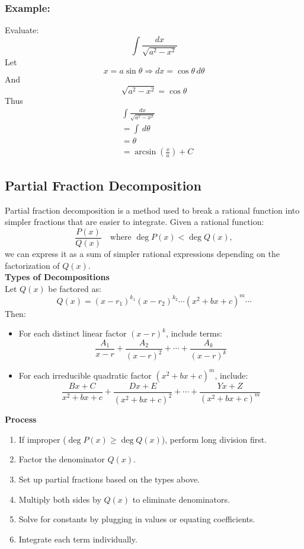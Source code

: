 \documentclass[11pt]{article}
\begin{document}
\subsubsection*{Example:}
Evaluate:
\[
    \int \frac{dx}{\sqrt{a^2-x^2}}
\]
Let
\[
    x=a\sin\theta \Rightarrow dx=\cos\theta\,d\theta
\]
And
\[
    \sqrt{a^2-x^2}=\cos\theta
\]
Thus
\[
    \begin{aligned}
        &\int \frac{dx}{\sqrt{a^2-x^2}}\\[.5em]
        &=\int\,d\theta\\[.5em]
        &=\theta\\[.5em]
        &=\arcsin(\frac{x}{a})+C
    \end{aligned}
\]
\subsection{Partial Fraction Decomposition}
Partial fraction decomposition is a method used to break a rational function into simpler fractions that are easier to integrate.
Given a rational function:
\[
    \frac{P(x)}{Q(x)} \quad \text{where } \deg P(x) < \deg Q(x),
\]
we can express it as a sum of simpler rational expressions depending on the factorization of $Q(x)$.\\[.5em]
\textbf{Types of Decompositions}\\[.5em]
\noindent
Let $Q(x)$ be factored as:
\[
    Q(x) = (x - r_1)^{k_1}(x - r_2)^{k_2}\cdots (x^2 + bx + c)^m\cdots
\]Then:
\begin{itemize}
    \item For each distinct linear factor $(x - r)^k$, include terms:
    \[
    \frac{A_1}{x - r} + \frac{A_2}{(x - r)^2} + \cdots + \frac{A_k}{(x - r)^k}
    \]
    
    \item For each irreducible quadratic factor $(x^2 + bx + c)^m$, include:
    \[
    \frac{Bx + C}{x^2 + bx + c} + \frac{Dx + E}{(x^2 + bx + c)^2} + \cdots + \frac{Yx + Z}{(x^2 + bx + c)^m}
    \]
\end{itemize}
\noindent
\textbf{Process}
\begin{enumerate}
    \item If improper ($\deg P(x) \geq \deg Q(x)$), perform long division first.
    \item Factor the denominator $Q(x)$.
    \item Set up partial fractions based on the types above.
    \item Multiply both sides by $Q(x)$ to eliminate denominators.
    \item Solve for constants by plugging in values or equating coefficients.
    \item Integrate each term individually.
\end{enumerate}
\end{document}
